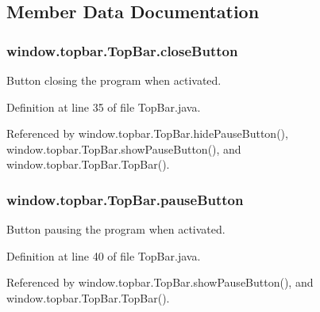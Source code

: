 \subsection{Member Data Documentation}
\hypertarget{classwindow_1_1topbar_1_1_top_bar_a98271c11b9bbb79d1e79e03752d4e0b4}{
\subsubsection[{close\-Button}]{ window.\-topbar.\-Top\-Bar.\-close\-Button\hspace{0.3cm}{\ttfamily [protected]}}}\label{classwindow_1_1topbar_1_1_top_bar_a98271c11b9bbb79d1e79e03752d4e0b4}


Button closing the program when activated. 



Definition at line 35 of file Top\-Bar.\-java.



Referenced by window.\-topbar.\-Top\-Bar.\-hide\-Pause\-Button(), window.\-topbar.\-Top\-Bar.\-show\-Pause\-Button(), and window.\-topbar.\-Top\-Bar.\-Top\-Bar().

\hypertarget{classwindow_1_1topbar_1_1_top_bar_ac7b4f88657cb97d1ae3df6a99d3694e9}{
\subsubsection[{pause\-Button}]{ window.\-topbar.\-Top\-Bar.\-pause\-Button\hspace{0.3cm}{\ttfamily [protected]}}}\label{classwindow_1_1topbar_1_1_top_bar_ac7b4f88657cb97d1ae3df6a99d3694e9}


Button pausing the program when activated. 



Definition at line 40 of file Top\-Bar.\-java.



Referenced by window.\-topbar.\-Top\-Bar.\-show\-Pause\-Button(), and window.\-topbar.\-Top\-Bar.\-Top\-Bar().

